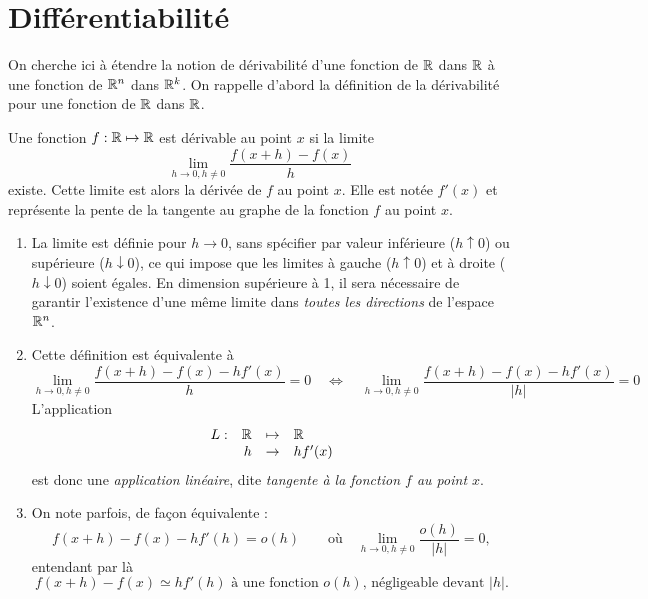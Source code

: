 \section{Différentiabilité} \label{sec:Multivar-Diff}


On cherche ici à étendre la notion de dérivabilité d'une fonction de $\mathbb{R}$ dans $\mathbb{R}$ à une fonction de $\mathbb{R}^n$ dans $\mathbb{R}^k$. On rappelle d'abord la définition de la dérivabilité pour une fonction de $\mathbb{R}$ dans $\mathbb{R}$.

\begin{definition}[Dérivabilité] \label{def:derivabilite}
  Une fonction $f: \mathbb{R} \mapsto \mathbb{R}$ est dérivable au point $x$ si la limite
  $$
  \lim_{h \to 0, h \neq 0} \frac{f(x+h) - f(x)}{h}
  $$
  existe. Cette limite est alors la dérivée de $f$ au point $x$. Elle est notée $f'(x)$ et représente la pente de la tangente au graphe de la fonction $f$ au point $x$.
\end{definition}

\remarks
\begin{enumerate}
  \item La limite est définie pour $h \to 0$, sans spécifier par valeur inférieure ($h \uparrow 0$) ou supérieure ($h \downarrow 0$), ce qui impose que les limites à gauche ($h \uparrow 0$) et à droite ($h \downarrow 0$) soient égales. En dimension supérieure à 1, il sera nécessaire de garantir l'existence d'une même limite dans {\em toutes les directions} de l'espace $\mathbb{R}^n$.
  \item Cette définition est équivalente à
  $$
  \lim_{h\to 0, h \neq 0} \frac{f(x+h) - f(x) - hf'(x)}{h} = 0
  \quad \Leftrightarrow \quad 
  \lim_{h\to 0, h \neq 0} \frac{f(x+h) - f(x) - hf'(x)}{|h|} = 0
  $$
  L'application 
  $$
  \begin{array}{rrcl}
    L :  & \mathbb{R} & \mapsto & \mathbb{R} \\
    & h & \to &  hf'(x)
  \end{array}
  $$
  est donc une {\em application linéaire}, dite {\em tangente à la fonction $f$ au point $x$}.
  \item On note parfois, de façon équivalente :
  $$
  f(x+h) - f(x) - h f'(h) = o(h)
  \qquad \text{où} \quad
  \lim_{h\to 0, h \neq 0} \frac{o(h)}{|h|} = 0,
  $$
  entendant par là 
  $$
  \text{$f(x+h) - f(x) \simeq h f'(h)$ à une fonction $o(h)$, négligeable devant $|h|$.}
  $$
\end{enumerate}

